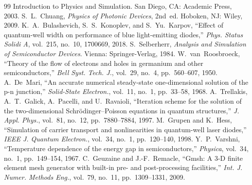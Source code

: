 \documentclass[conference]{IEEEtran}
\begin{document}
\begin{thebibliography}{99}
{Introduction to Physics and Simulation}. San Diego, CA: Academic Press, 2003.
 S.~L.~Chuang, \emph{Physics of Photonic Devices}, 2nd~ed.
Hoboken, NJ: Wiley, 2009.
 K.~A.~Bulashevich, S.~S.~Konoplev, and S.~Yu.~Karpov,
``Effect of quantum-well width on performance of blue light-emitting diodes,''
\emph{Phys. Status Solidi A}, vol.~215, no.~10, 1700669, 2018.
 S.~Selberherr, \emph{Analysis and Simulation of Semiconductor
Devices}. Vienna: Springer-Verlag, 1984.
 W.~van~Roosbroeck, ``Theory of the flow of electrons and
holes in germanium and other semiconductors,'' \emph{Bell Syst. Tech. J.},
vol.~29, no.~4, pp.~560--607, 1950.
 A.~De~Mari, ``An accurate numerical steady-state one-dimensional
solution of the p-n junction,'' \emph{Solid-State Electron.}, vol.~11, no.~1,
pp.~33--58, 1968.
 A.~Trellakis, A.~T.~Galick, A.~Pacelli, and U.~Ravaioli,
``Iteration scheme for the solution of the two-dimensional Schr\"odinger--Poisson
equations in quantum structures,'' \emph{J. Appl. Phys.}, vol.~81, no.~12,
pp.~7880--7884, 1997.
 M.~Grupen and K.~Hess, ``Simulation of carrier transport and
nonlinearities in quantum-well laser diodes,'' \emph{IEEE J. Quantum Electron.},
vol.~34, no.~1, pp.~120--140, 1998.
 Y.~P.~Varshni, ``Temperature dependence of the energy gap in
semiconductors,'' \emph{Physica}, vol.~34, no.~1, pp.~149--154, 1967.
 C.~Geuzaine and J.-F.~Remacle, ``Gmsh: A 3-D finite element mesh
generator with built-in pre- and post-processing facilities,'' \emph{Int. J.
Numer. Methods Eng.}, vol.~79, no.~11, pp.~1309--1331, 2009.
\end{thebibliography}
\end{document}
